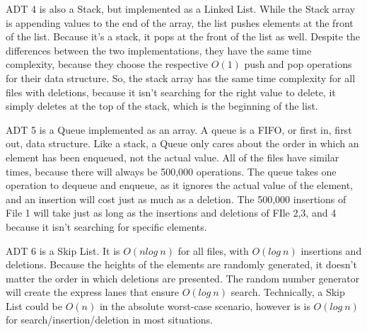 \documentclass[12pt]{article}
\begin{document}
\begin{doublespace}
    ADT 4 is also a Stack, but implemented as a Linked List. While the Stack array is appending values to the end of the array, the list pushes elements at the front of the list. Because it's a stack, it pops at the front of the list as well. Despite the differences between the two implementations, they have the same time complexity, because they choose the respective $O(1)$ push and pop operations for their data structure. So, the stack array has the same time complexity for all files with deletions, because it isn't searching for the right value to delete, it simply deletes at the top of the stack, which is the beginning of the list.

    ADT 5 is a Queue implemented as an array. A queue is a FIFO, or first in, first out, data structure. Like a stack, a Queue only cares about the order in which an element has been enqueued, not the actual value. All of the files have similar times, because there will always be 500,000 operations. The queue takes one operation to dequeue and enqueue, as it ignores the actual value of the element, and an insertion will cost just as much as a deletion. The 500,000 insertions of File 1 will take just as long as the insertions and deletions of FIle 2,3, and 4 because it isn't searching for specific elements.

    ADT 6 is a Skip List. It is $O(nlog\:n)$ for all files, with $O(log\:n)$ insertions and deletions. Because the heights of the elements are randomly generated, it doesn't matter the order in which deletions are presented. The random number generator will create the express lanes that ensure $O(log\:n)$ search. Technically, a Skip List could be $O(n)$ in the absolute worst-case scenario, however is is $O(log\:n)$ for search/insertion/deletion in most situations.



\end{doublespace}
\end{document}
